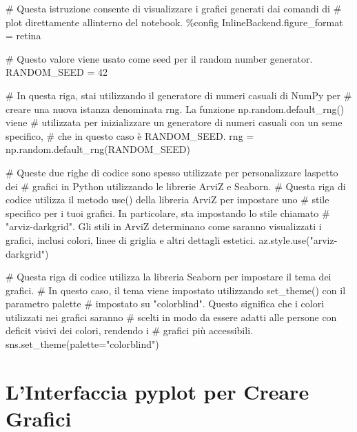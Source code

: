\documentclass[
  letterpaper,
  krantz2]{{[}./krantz{]}}
\newenvironment{Shaded}{\begin{snugshade}}{\end{snugshade}}
\newcommand{\CommentTok}[1]{\textcolor[rgb]{0.37,0.37,0.37}{#1}}
\newcommand{\DecValTok}[1]{\textcolor[rgb]{0.68,0.00,0.00}{#1}}
\newcommand{\NormalTok}[1]{\textcolor[rgb]{0.00,0.23,0.31}{#1}}
\newcommand{\OperatorTok}[1]{\textcolor[rgb]{0.37,0.37,0.37}{#1}}
\newcommand{\StringTok}[1]{\textcolor[rgb]{0.13,0.47,0.30}{#1}}
\begin{document}
\begin{Shaded}
\begin{Highlighting}[]
\CommentTok{\# Questa istruzione consente di visualizzare i grafici generati dai comandi di }
\CommentTok{\# plot direttamente all\textquotesingle{}interno del notebook.}
\OperatorTok{\%}\NormalTok{config InlineBackend.figure\_format }\OperatorTok{=} \StringTok{\textquotesingle{}retina\textquotesingle{}}

\CommentTok{\# Questo valore viene usato come seed per il random number generator.}
\NormalTok{RANDOM\_SEED }\OperatorTok{=} \DecValTok{42}

\CommentTok{\# In questa riga, stai utilizzando il generatore di numeri casuali di NumPy per }
\CommentTok{\# creare una nuova istanza denominata rng. La funzione np.random.default\_rng() viene }
\CommentTok{\# utilizzata per inizializzare un generatore di numeri casuali con un seme specifico, }
\CommentTok{\# che in questo caso è RANDOM\_SEED.}
\NormalTok{rng }\OperatorTok{=}\NormalTok{ np.random.default\_rng(RANDOM\_SEED)}

\CommentTok{\# Queste due righe di codice sono spesso utilizzate per personalizzare l\textquotesingle{}aspetto dei }
\CommentTok{\# grafici in Python utilizzando le librerie ArviZ e Seaborn.}
\CommentTok{\# Questa riga di codice utilizza il metodo use() della libreria ArviZ per impostare uno }
\CommentTok{\# stile specifico per i tuoi grafici. In particolare, sta impostando lo stile chiamato }
\CommentTok{\# "arviz{-}darkgrid". Gli stili in ArviZ determinano come saranno visualizzati i grafici, inclusi colori, linee di griglia e altri dettagli estetici.}
\NormalTok{az.style.use(}\StringTok{"arviz{-}darkgrid"}\NormalTok{)}

\CommentTok{\# Questa riga di codice utilizza la libreria Seaborn per impostare il tema dei grafici. }
\CommentTok{\# In questo caso, il tema viene impostato utilizzando set\_theme() con il parametro palette }
\CommentTok{\# impostato su "colorblind". Questo significa che i colori utilizzati nei grafici saranno }
\CommentTok{\# scelti in modo da essere adatti alle persone con deficit visivi dei colori, rendendo i }
\CommentTok{\# grafici più accessibili.}
\NormalTok{sns.set\_theme(palette}\OperatorTok{=}\StringTok{"colorblind"}\NormalTok{)}
\end{Highlighting}
\end{Shaded}

\section{L'Interfaccia pyplot per Creare
Grafici}\label{linterfaccia-pyplot-per-creare-grafici}
\end{document}
